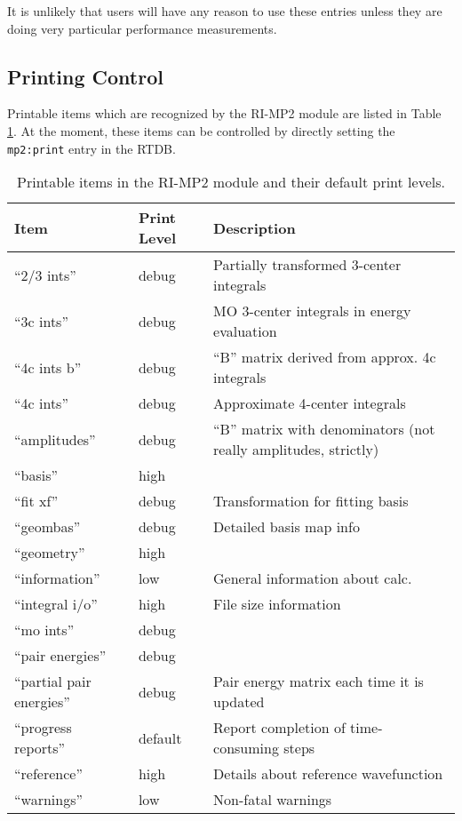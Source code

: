 It is unlikely that users will have any reason to use these entries
unless they are doing very particular performance measurements.

\subsection{Printing Control}

Printable items which are recognized by the RI-MP2 module are listed
in Table \ref{tbl:mp2-printable}.  At the moment, these items can be
controlled by directly setting the
\verb+mp2:print+ entry in the RTDB.

\begin{table}
\caption{Printable items in the RI-MP2 module and their default print levels.}
\label{tbl:mp2-printable}
\begin{tabular}{lll}
\hline\hline
Item                    & Print Level   & Description \\
\hline
``2/3 ints''              & debug         & Partially transformed 3-center integrals \\
``3c ints''               & debug         & MO 3-center integrals in energy evaluation \\
``4c ints b''             & debug         & ``B'' matrix derived from approx. 4c integrals \\
``4c ints''               & debug         & Approximate 4-center integrals \\
``amplitudes''            & debug         & ``B'' matrix with denominators (not really amplitudes, strictly) \\
``basis''                 & high          & \\
``fit xf''                & debug         & Transformation for fitting basis \\
``geombas''               & debug         & Detailed basis map info\\
``geometry''              & high          & \\
``information''           & low           & General information about calc.\\
``integral i/o''          & high          & File size information\\
``mo ints''               & debug         & \\
``pair energies''         & debug         & \\
``partial pair energies'' & debug         & Pair energy matrix each time it is updated \\
``progress reports''      & default       & Report completion of time-consuming steps\\
``reference''             & high          & Details about reference wavefunction\\
``warnings''              & low           & Non-fatal warnings \\
\hline\hline
\end{tabular}
\end{table}

